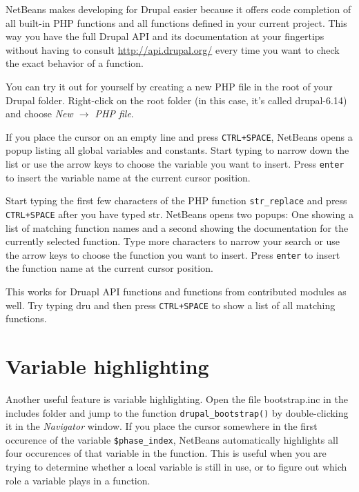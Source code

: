 \documentclass[final,ebook,10pt,twoside,openright]{memoir}
\begin{document}
NetBeans makes developing for Drupal easier because it offers code completion of all built-in PHP functions and all functions defined in your current project. This way you have the full Drupal API and its documentation at your fingertips without having to consult \url{http://api.drupal.org/} every time you want to check the exact behavior of a function.

You can try it out for yourself by creating a new PHP file in the root of your Drupal folder. Right-click on the root folder (in this case, it’s called drupal-6.14) and choose \emph{New $\rightarrow$ PHP file}.

If you place the cursor on an empty line and press \verb!CTRL+SPACE!, NetBeans opens a popup listing all global variables and constants. Start typing to narrow down the list or use the arrow keys to choose the variable you want to insert. Press \verb!enter! to insert the variable name at the current cursor position.

Start typing the first few characters of the PHP function \verb!str_replace! and press \verb!CTRL+SPACE! after you have typed str. NetBeans opens two popups: One showing a list of matching function names and a second showing the documentation for the currently selected function. Type more characters to narrow your search or use the arrow keys to choose the function you want to insert. Press \verb!enter! to insert the function name at the current cursor position.

This works for Druapl API functions and functions from contributed modules as well. Try typing dru and then press \verb!CTRL+SPACE! to show a list of all matching functions.

\section{Variable highlighting}

Another useful feature is variable highlighting. Open the file bootstrap.inc in the includes folder and jump to the function \verb!drupal_bootstrap()! by double-clicking it in the \emph{Navigator} window. If you place the cursor somewhere in the first occurence of the variable \verb!$phase_index!, NetBeans automatically highlights all four occurences of that variable in the function. This is useful when you are trying to determine whether a local variable is still in use, or to figure out which role a variable plays in a function.
\end{document}
